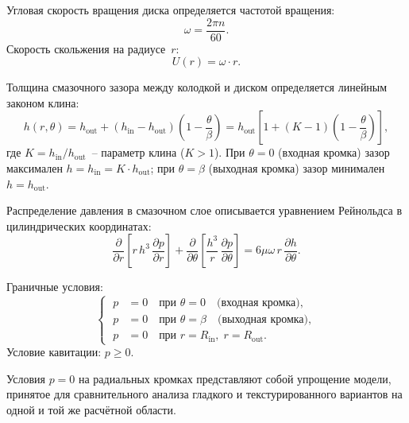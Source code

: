 Угловая скорость вращения диска определяется частотой вращения:
\begin{equation}
  \omega = \frac{2\pi n}{60}.
  \label{eq:thrust_omega}
\end{equation}
Скорость скольжения на радиусе~$r$:
\begin{equation}
  U(r) = \omega \cdot r.
  \label{eq:thrust_U}
\end{equation}

Толщина смазочного зазора между колодкой и диском определяется
линейным законом клина:
\begin{equation}
  h(r, \theta) = h_{\mathrm{out}}
    + (h_{\mathrm{in}} - h_{\mathrm{out}})
    \left(1 - \frac{\theta}{\beta}\right)
  = h_{\mathrm{out}}
    \left[1 + (K - 1)\left(1 - \frac{\theta}{\beta}\right)\right],
  \label{eq:thrust_h}
\end{equation}
где $K = h_{\mathrm{in}} / h_{\mathrm{out}}$~-- параметр клина
($K > 1$). При $\theta = 0$ (входная кромка) зазор максимален
$h = h_{\mathrm{in}} = K \cdot h_{\mathrm{out}}$; при
$\theta = \beta$ (выходная кромка) зазор минимален
$h = h_{\mathrm{out}}$.

Распределение давления в смазочном слое описывается уравнением
Рейнольдса в цилиндрических координатах:
\begin{equation}
  \frac{\partial}{\partial r}
    \left[r\, h^3\, \frac{\partial p}{\partial r}\right]
  + \frac{\partial}{\partial \theta}
    \left[\frac{h^3}{r}\, \frac{\partial p}{\partial \theta}\right]
  = 6\mu\omega\, r\, \frac{\partial h}{\partial \theta}.
  \label{eq:thrust_reynolds}
\end{equation}

Граничные условия:
\begin{equation}
\left\{\;
\begin{aligned}
  p &= 0 \quad \text{при } \theta = 0
    \quad \text{(входная кромка)}, \\
  p &= 0 \quad \text{при } \theta = \beta
    \quad \text{(выходная кромка)}, \\
  p &= 0 \quad \text{при } r = R_{\mathrm{in}},\;
    r = R_{\mathrm{out}}.
\end{aligned}
\right.
  \label{eq:thrust_bc}
\end{equation}
Условие кавитации: $p \geq 0$.

Условия $p = 0$ на радиальных кромках представляют собой упрощение
модели, принятое для сравнительного анализа гладкого
и текстурированного вариантов на одной и той же расчётной области.

